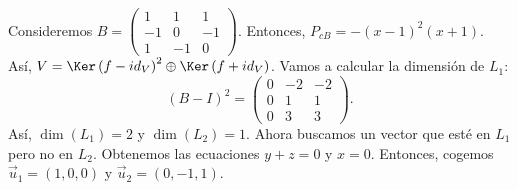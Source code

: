 \begin{eg}
	\normalfont Consideremos $\displaystyle B = \begin{pmatrix} 1 & 1 & 1 \\ - 1 & 0 & - 1 \\ 1 & - 1 & 0 \end{pmatrix} $. Entonces, $\displaystyle P_{cB} = -\left(x-1\right)^{2}\left(x+1\right) $. Así, $\displaystyle V = \Ker\left(f - id _{V}\right)^{2} \oplus \Ker\left(f + id _{V}\right) $. Vamos a calcular la dimensión de $\displaystyle L_{1} $:
	\[\left(B - I\right)^{2} = \begin{pmatrix} 0 & - 2 & - 2 \\ 0 & 1 & 1 \\ 0 & 3 & 3 \end{pmatrix} .\]
Así, $\displaystyle \dim\left(L_{1}\right) = 2 $ y $\displaystyle \dim\left(L_{2}\right) = 1 $. Ahora buscamos un vector que esté en $\displaystyle L_{1} $ pero no en $\displaystyle L_{2} $. Obtenemos las ecuaciones $\displaystyle y + z = 0 $ y $\displaystyle x = 0 $. Entonces, cogemos $\displaystyle \vec{u}_{1} = \left(1, 0, 0\right) $ y $\displaystyle \vec{u}_{2} = \left(0, -1, 1\right) $.  
\end{eg}

